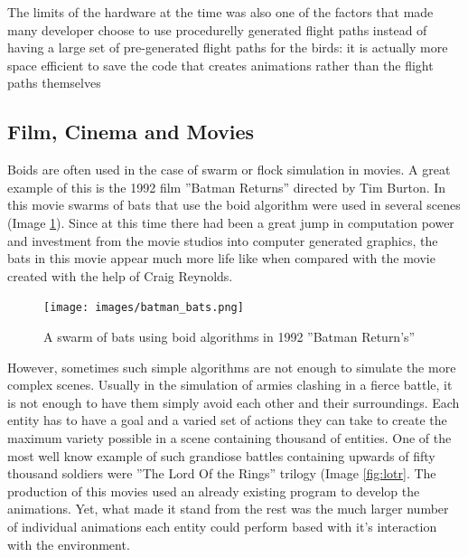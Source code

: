 \documentclass[sigconf]{acmart}
\begin{document}
The limits of the hardware at the time was also one of the factors that made many developer
choose to use procedurelly generated flight paths instead of having a large set of pre-generated
flight paths for the birds: it is actually more space efficient to save the code that creates
animations rather than the flight paths themselves

\subsection{Film, Cinema and Movies}

Boids are often used in the case of swarm or flock simulation in movies\cite{BAJEC2009777}. A great example of this
is the 1992 film ''Batman Returns'' directed by Tim Burton. In this movie swarms of bats that use the boid
algorithm were used in several scenes (Image \ref{fig:batmanSwarm}). Since at this time there had been a
great jump in computation power and investment from the movie studios into computer generated graphics,
the bats in this movie appear much more life like when compared with the movie created with the help of
Craig Reynolds.

\begin{figure}[h]
  \centering
  \texttt{[image: images/batman\_bats.png]}
  \caption{A swarm of bats using boid algorithms in 1992 ''Batman Return's''}
  \label{fig:batmanSwarm}
\end{figure}

However, sometimes such simple algorithms are not enough to simulate the more complex scenes.
Usually in the simulation of armies clashing in a fierce battle, it is not enough to have them
simply avoid each other and their surroundings. Each entity has to have a goal and a varied set
of actions they can take to create the maximum variety possible in a scene containing thousand of
entities\cite{Davis2003MultipleAS}. One of the most well know example of such grandiose battles
containing upwards of fifty thousand soldiers were ''The Lord Of the Rings'' trilogy
(Image \ref{fig:lotr}. The production of this movies used an already existing program to develop
the animations. Yet, what made it stand from the rest was the much larger number of individual
animations each entity could perform based with it's interaction with the environment.
\end{document}
